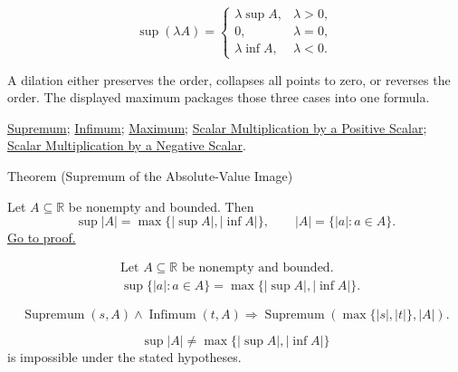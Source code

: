 \begin{remark*}
\[
\sup(\lambda A)=
\begin{cases}
\lambda\sup A, & \lambda>0,\\
0, & \lambda=0,\\
\lambda\inf A, & \lambda<0.
\end{cases}
\]
\end{remark*}

\begin{remark*}[Interpretation]
A dilation either preserves the order, collapses all points to zero, or reverses the order. The displayed maximum packages those three cases into one formula.
\end{remark*}

\begin{dependencies}
\hyperref[def:supremum]{Supremum};
\hyperref[def:infimum]{Infimum};
\hyperref[def:maximum]{Maximum};
\hyperref[thm:scalar-mult-positive]{Scalar Multiplication by a Positive Scalar};
\hyperref[thm:scalar-mult-negative]{Scalar Multiplication by a Negative Scalar}.
\end{dependencies}


\begin{theorembox}{Theorem (Supremum of the Absolute-Value Image)}
\begin{theorem}
\label{thm:supremum-absolute-value-image}
Let $A\subseteq\mathbb{R}$ be nonempty and bounded. Then
\[
  \sup |A|=\max\{|\sup A|,|\inf A|\},
  \qquad
  |A|=\{|a|:a\in A\}.
\]
\hyperref[prf:supremum-absolute-value-image]{Go to proof.}
\end{theorem}
\end{theorembox}

\begin{remark*}
\[
\begin{aligned}
&\text{Let }A\subseteq\mathbb{R}\text{ be nonempty and bounded.}\\
&\sup\{|a|:a\in A\}=\max\{|\sup A|,|\inf A|\}.
\end{aligned}
\]
\end{remark*}

\begin{remark*}
\[
\operatorname{Supremum}(s,A)\land \operatorname{Infimum}(t,A)
\Longrightarrow
\operatorname{Supremum}(\max\{|s|,|t|\},|A|).
\]
\end{remark*}

\begin{remark*}
\[
\sup |A|\ne \max\{|\sup A|,|\inf A|\}
\]
is impossible under the stated hypotheses.
\end{remark*}

